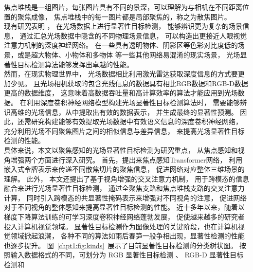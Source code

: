 焦点堆栈是一组图片，每张图片具有不同的景深，可以理解为与相机在不同距离位置的聚焦成像，
焦点堆栈中的每一图片都是局部聚焦的，称之为散焦图片。
\\
%
%
%
%
\indent
现有研究表明
，
在光场数据上进行显著性目标检测，
能够辨识更为复杂的场景信息，
通过汇总光场数据中隐含的不同物理场景信息，
可以构造出更接近人眼视觉注意力机制的深度神经网络。
在一些具有透明物体、阴影区等色彩对比度低的场景，或是超大物体、小物体和多物体
等一些其他网络易混淆的现实场景，
光场显著性目标检测算法能够发挥出卓越的性能。
\\
%
%
%
%
\indent
然而，在现实物理世界中，
光场数据相比利用激光雷达获取深度信息的方式要更加少见。
且光场相机获取的包含光线信息的数据具有相比RGB数据和RGB-D数据更高的数据维度，
这意味着高数据吞吐量和高计算效率的算法才能应用到光场数据。
在利用深度卷积神经网络模型构建光场显著性目标检测算法时，
需要能够辨识高维的光场信息，从中提取出有效的数据表示，
并生成最终的显著性预测。
因此，还需研究构建能够有效提取光场数据中有效语义信息的深度卷积神经网络，
充分利用光场不同聚焦图片之间的相似信息与差异信息，
来提高光场显著性目标检测的性能。
\\
%
%
%
%
\indent
具体来说，本文以聚焦感知的光场显著性目标检测为研究重点，
从焦点感知和视角增强两个方面进行深入研究。
首先，提出来焦点感知Transformer网络，
利用嵌入式令牌表示来传递不同散焦切片的聚焦信息，
促进网络对应整体三维场景的理解。
此外，
本文还提出了基于视角增强的交叉注意力机制，
用于跨模态的信息融合来进行光场显著性目标检测，
通过全聚焦支路和焦点堆栈支路的交叉注意力计算，
同时引入跨模态的共显著性掩码表示来增强对不同视角的注意，
促进网络对于不同视角的整体感知来提高显著性目标检测的性能。
%
%
近十多年以来，随着以梯度下降算法训练的可学习深度卷积神经网络蓬勃发展，
促使越来越多的研究者投入计算机视觉领域。
显著性目标检测作为图像处理的关键阶段，也在计算机视觉领域掀起浪潮，
各种不同的算法如雨后春笋一般争相出现，显著性检测的性能也逐步提升。
图~\ref{chpt1:fig:kinds}~展示了目前显著性目标检测的分类树状图。
按照输入数据格式的不同，可划分为
RGB 显著性目标检测
、
RGB-D 显著性目标检测和
